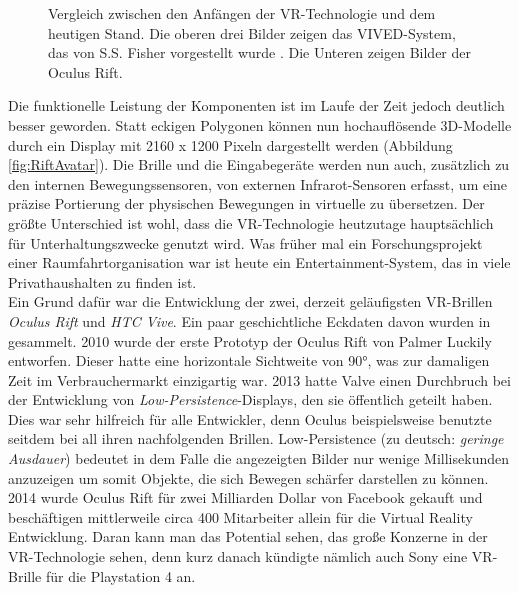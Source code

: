 \begin{figure}%
    \centering
    \qquad
    \qquad
    \qquad
    \qquad
    \qquad
    \caption{Vergleich zwischen den Anfängen der VR-Technologie und dem heutigen Stand. Die oberen drei Bilder zeigen das VIVED-System, das von S.S. Fisher vorgestellt wurde \cite{bib:NasaVr}. Die Unteren zeigen Bilder der Oculus Rift.}\label{fig:VIVED}%
\end{figure}

Die funktionelle Leistung der Komponenten ist im Laufe der Zeit jedoch deutlich besser geworden. Statt eckigen Polygonen können nun hochauflösende 3D-Modelle durch ein Display mit 2160 x 1200 Pixeln dargestellt werden (Abbildung \ref{fig:RiftAvatar}). Die Brille und die Eingabegeräte werden nun auch, zusätzlich zu den internen Bewegungssensoren, von externen Infrarot-Sensoren erfasst, um eine präzise Portierung der physischen Bewegungen in virtuelle zu übersetzen. Der größte Unterschied ist wohl, dass die VR-Technologie heutzutage hauptsächlich für Unterhaltungszwecke genutzt wird. Was früher mal ein Forschungsprojekt einer Raumfahrtorganisation war ist heute ein Entertainment-System, das in viele Privathaushalten zu finden ist.\\

Ein Grund dafür war die Entwicklung der zwei, derzeit geläufigsten VR-Brillen \textit{Oculus Rift} und \textit{HTC Vive}. Ein paar geschichtliche Eckdaten davon wurden in \cite{bib:RiftHistorical} gesammelt. 2010 wurde der erste Prototyp der Oculus Rift von Palmer Luckily entworfen. Dieser hatte eine horizontale Sichtweite von 90°, was zur damaligen Zeit im Verbrauchermarkt einzigartig war. 2013 hatte Valve einen Durchbruch bei der Entwicklung von \textit{Low-Persistence}-Displays, den sie öffentlich geteilt haben. Dies war sehr hilfreich für alle Entwickler, denn Oculus beispielsweise benutzte seitdem bei all ihren nachfolgenden Brillen. Low-Persistence (zu deutsch: \textit{geringe Ausdauer}) bedeutet in dem Falle die angezeigten Bilder nur wenige Millisekunden anzuzeigen um somit Objekte, die sich Bewegen schärfer darstellen zu können. 2014 wurde Oculus Rift für zwei Milliarden Dollar von Facebook gekauft und beschäftigen mittlerweile circa 400 Mitarbeiter allein für die Virtual Reality Entwicklung. Daran kann man das Potential sehen, das große Konzerne in der VR-Technologie sehen, denn kurz danach kündigte nämlich auch Sony eine VR-Brille für die Playstation 4 an.\\

